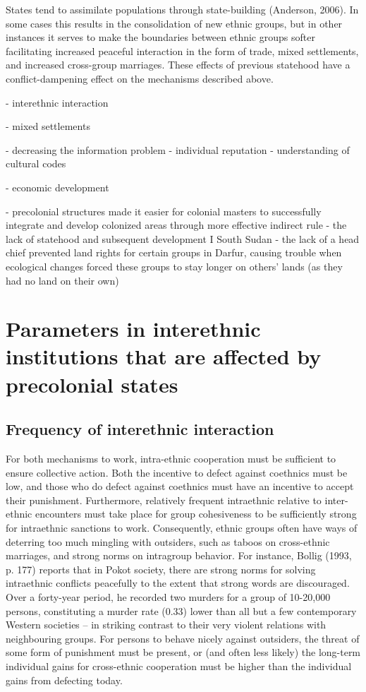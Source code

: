 \documentclass[12pt]{article}
\begin{document}
States tend to assimilate populations through state-building (Anderson, 2006). In some cases this results in the consolidation of new ethnic groups, but in other instances it serves to make the boundaries between ethnic groups softer facilitating increased peaceful interaction in the form of trade, mixed settlements, and increased cross-group marriages. These effects of previous statehood have a conflict-dampening effect on the mechanisms described above.

- interethnic interaction

- mixed settlements

- decreasing the information problem
	- individual reputation
	- understanding of cultural codes

- economic development

- precolonial structures made it easier for colonial masters to successfully integrate and develop colonized areas through more effective indirect rule
	- the lack of statehood and subsequent development I South Sudan
	- the lack of a head chief prevented land rights for certain groups in Darfur, causing trouble when ecological changes forced these groups to stay longer on others’ lands (as they had no land on their own)

\section{Parameters in interethnic institutions that are affected by precolonial
states}

\subsection{Frequency of interethnic interaction}

For both mechanisms to work, intra-ethnic cooperation must be sufficient to
ensure collective action. Both the incentive to defect against coethnics must be
low, and those who do defect against coethnics must have an incentive to accept
their punishment. Furthermore, relatively frequent intraethnic relative to
inter-ethnic encounters must take place for group cohesiveness to be
sufficiently strong for intraethnic sanctions to work. Consequently, ethnic
groups often have ways of deterring too much mingling with outsiders, such as
taboos on cross-ethnic marriages, and strong norms on intragroup behavior. For
instance, Bollig (1993, p. 177) reports that in Pokot society, there are strong
norms for solving intraethnic conflicts peacefully to the extent that strong
words are discouraged. Over a forty-year period, he recorded two murders for a
group of 10-20,000 persons, constituting a murder rate (0.33) lower than all but
a few contemporary Western societies – in striking contrast to their very
violent relations with neighbouring groups. For persons to behave nicely
against outsiders, the threat of some form of punishment must be present, or
(and often less likely) the long-term individual gains for cross-ethnic
cooperation must be higher than the individual gains from defecting today.
\end{document}
